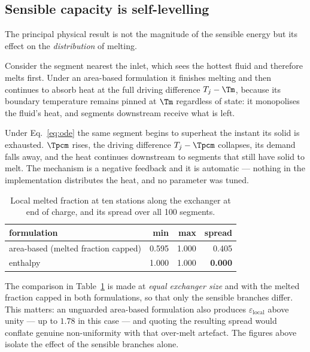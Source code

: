 \subsection{Sensible capacity is self-levelling}
\label{sec:levelling}

The principal physical result is not the magnitude of the sensible energy but
its effect on the \emph{distribution} of melting.

Consider the segment nearest the inlet, which sees the hottest fluid and
therefore melts first. Under an area-based formulation it finishes melting and
then continues to absorb heat at the full driving difference $T_{j}-\Tm$,
because its boundary temperature remains pinned at $\Tm$ regardless of state: it
monopolises the fluid's heat, and segments downstream receive what is left.

Under Eq.~\eqref{eq:ode} the same segment begins to superheat the instant its
solid is exhausted. $\Tpcm$ rises, the driving difference $T_{j}-\Tpcm$
collapses, its demand falls away, and the heat continues downstream to segments
that still have solid to melt. The mechanism is a negative feedback and it is
automatic --- nothing in the implementation distributes the heat, and no
parameter was tuned.

\begin{table}[htbp]
\centering
\caption{Local melted fraction at ten stations along the exchanger at end of
charge, and its spread over all \num{100} segments.}
\label{tab:levelling}
\begin{tabular}{@{}l r r r@{}}
\toprule
formulation & min & max & spread \\
\midrule
area-based (melted fraction capped) & 0.595 & 1.000 & 0.405 \\
enthalpy                            & 1.000 & 1.000 & \textbf{0.000} \\
\bottomrule
\end{tabular}
\end{table}

The comparison in Table~\ref{tab:levelling} is made at \emph{equal exchanger
size} and with the melted fraction capped in both formulations, so that only the
sensible branches differ. This matters: an unguarded area-based formulation also
produces $\varepsilon_{\mathrm{local}}$ above unity --- up to $1.78$ in this
case --- and quoting the resulting spread would conflate genuine non-uniformity
with that over-melt artefact. The figures above isolate the effect of the
sensible branches alone.

